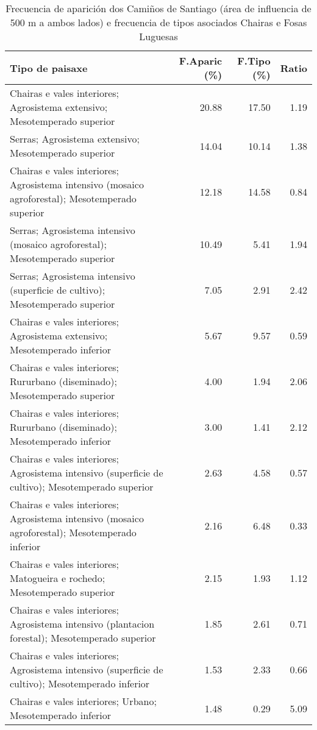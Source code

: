 \begin{table}[p]
\centering
\caption{Frecuencia de aparición dos Camiños de Santiago (área de influencia de 500 m a ambos lados) e frecuencia de tipos asociados Chairas e Fosas Luguesas} 
\label{vcamino6}
\begin{tabular}{lrrr}
  \hline
Tipo de paisaxe & F.Aparic (\%) & F.Tipo (\%) & Ratio \\ 
  \hline
Chairas e vales interiores; Agrosistema extensivo; Mesotemperado superior & 20.88 & 17.50 & 1.19 \\ 
  Serras; Agrosistema extensivo; Mesotemperado superior & 14.04 & 10.14 & 1.38 \\ 
  Chairas e vales interiores; Agrosistema intensivo (mosaico agroforestal); Mesotemperado superior & 12.18 & 14.58 & 0.84 \\ 
  Serras; Agrosistema intensivo (mosaico agroforestal); Mesotemperado superior & 10.49 & 5.41 & 1.94 \\ 
  Serras; Agrosistema intensivo (superficie de cultivo); Mesotemperado superior & 7.05 & 2.91 & 2.42 \\ 
  Chairas e vales interiores; Agrosistema extensivo; Mesotemperado inferior & 5.67 & 9.57 & 0.59 \\ 
  Chairas e vales interiores; Rururbano (diseminado); Mesotemperado superior & 4.00 & 1.94 & 2.06 \\ 
  Chairas e vales interiores; Rururbano (diseminado); Mesotemperado inferior & 3.00 & 1.41 & 2.12 \\ 
  Chairas e vales interiores; Agrosistema intensivo (superficie de cultivo); Mesotemperado superior & 2.63 & 4.58 & 0.57 \\ 
  Chairas e vales interiores; Agrosistema intensivo (mosaico agroforestal); Mesotemperado inferior & 2.16 & 6.48 & 0.33 \\ 
  Chairas e vales interiores; Matogueira e rochedo; Mesotemperado superior & 2.15 & 1.93 & 1.12 \\ 
  Chairas e vales interiores; Agrosistema intensivo (plantacion forestal); Mesotemperado superior & 1.85 & 2.61 & 0.71 \\ 
  Chairas e vales interiores; Agrosistema intensivo (superficie de cultivo); Mesotemperado inferior & 1.53 & 2.33 & 0.66 \\ 
  Chairas e vales interiores; Urbano; Mesotemperado inferior & 1.48 & 0.29 & 5.09 \\ 
   \hline
\end{tabular}
\end{table}
